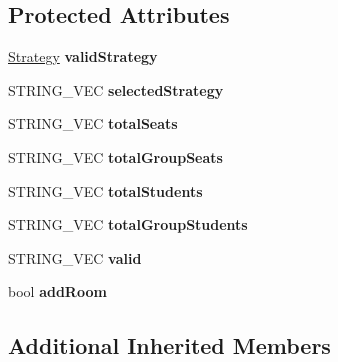 \subsection*{Protected Attributes}
\begin{DoxyCompactItemize}
\item 
\hypertarget{classValidStrategy_aac23ca61c16d79b48603a7db96617003}{\hyperlink{classStrategy}{Strategy} {\bfseries valid\-Strategy}}\label{classValidStrategy_aac23ca61c16d79b48603a7db96617003}

\item 
\hypertarget{classValidStrategy_a0400bdc1d25df2a613d50ed02c537eb2}{S\-T\-R\-I\-N\-G\-\_\-\-V\-E\-C {\bfseries selected\-Strategy}}\label{classValidStrategy_a0400bdc1d25df2a613d50ed02c537eb2}

\item 
\hypertarget{classValidStrategy_ad34fa679672d7685af9678e6c579e800}{S\-T\-R\-I\-N\-G\-\_\-\-V\-E\-C {\bfseries total\-Seats}}\label{classValidStrategy_ad34fa679672d7685af9678e6c579e800}

\item 
\hypertarget{classValidStrategy_a7344a7cf32192fa494ed9dd6784c509e}{S\-T\-R\-I\-N\-G\-\_\-\-V\-E\-C {\bfseries total\-Group\-Seats}}\label{classValidStrategy_a7344a7cf32192fa494ed9dd6784c509e}

\item 
\hypertarget{classValidStrategy_a4d0e361e6ed28a83332bebf66ab018e2}{S\-T\-R\-I\-N\-G\-\_\-\-V\-E\-C {\bfseries total\-Students}}\label{classValidStrategy_a4d0e361e6ed28a83332bebf66ab018e2}

\item 
\hypertarget{classValidStrategy_a4d947570307ce9d87d35f699ee10cae6}{S\-T\-R\-I\-N\-G\-\_\-\-V\-E\-C {\bfseries total\-Group\-Students}}\label{classValidStrategy_a4d947570307ce9d87d35f699ee10cae6}

\item 
\hypertarget{classValidStrategy_a66d7ba02a423a08f4f0af7c714787e76}{S\-T\-R\-I\-N\-G\-\_\-\-V\-E\-C {\bfseries valid}}\label{classValidStrategy_a66d7ba02a423a08f4f0af7c714787e76}

\item 
\hypertarget{classValidStrategy_aa18f4ff7dd65ed5702148c192f8627a6}{bool {\bfseries add\-Room}}\label{classValidStrategy_aa18f4ff7dd65ed5702148c192f8627a6}

\end{DoxyCompactItemize}
\subsection*{Additional Inherited Members}


